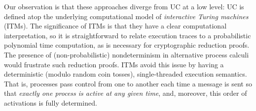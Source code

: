 Our observation is that these approaches diverge from UC at a low level: UC is
defined atop the underlying computational model of \emph{interactive Turing
  machines} (ITMs).
%
%
The significance of ITMs is that they have a clear computational interpretation,
so it is straightforward to relate execution traces to a probabilistic
polynomial time computation, as is necessary for cryptographic reduction proofs.
%
The presence of (non-probabilistic) nondeterminism in alternative process calculi
would frustrate such reduction proofs.
ITMs avoid this issue by having a deterministic
(modulo random coin tosses), single-threaded execution semantics. That is,
processes pass control from one to another each time a message is sent so that
\emph{exactly one process is active at any given time}, and, moreover, this
order of activations is fully determined.



